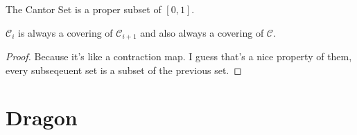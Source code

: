 \documentclass[11pt]{ekblite}
\begin{document}
	\begin{corollary}
		The Cantor Set is a proper subset of $[0,1]$.
	\end{corollary}
	\begin{corollary}
		$\mathcal{C}_{i}$ is always a covering of $\mathcal{C}_{i+1}$ and also always a covering of $\mathcal{C}$.
	\end{corollary}
	\begin{proof}
		Because it's like a contraction map. I guess that's a nice property of them, every subseqeuent set is a subset of the previous set.
	\end{proof}

\newpage
\section{Dragon}

\newpage

\end{document}

